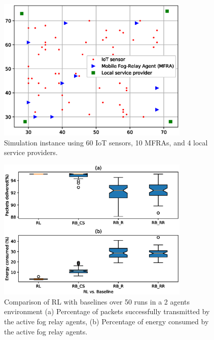 \documentclass[journal]{IEEEtran}
\begin{document}
\begin{figure}[!t]
\centering
\includegraphics[width=3.6in]{random_deploy.eps}
\caption{Simulation instance using 60 IoT sensors, 10 MFRAs, and 4 local service providers.}
\label{random_deploy}
\end{figure}

\begin{figure}[!t]
\centering
\includegraphics[width=3.6in]{2agentbaseline.eps}
\caption{Comparison of RL with baselines over 50 runs in a 2 agents environment (a) Percentage of packets successfully transmitted by the active fog relay agents,  (b) Percentage of energy consumed by the active fog relay agents.}
\label{2agent}
\end{figure}
\end{document}
